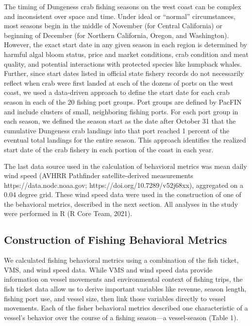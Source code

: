 \documentclass[]{elsarticle} %
\begin{document}
The timing of Dungeness crab fishing seasons on the west coast can be
complex and inconsistent over space and time. Under ideal or ``normal''
circumstances, most seasons begin in the middle of November (for Central
California) or beginning of December (for Northern California, Oregon,
and Washington). However, the exact start date in any given season in
each region is determined by harmful algal bloom status, price and
market conditions, crab condition and meat quality, and potential
interactions with protected species like humpback whales. Further, since
start dates listed in official state fishery records do not necessarily
reflect when crab were first landed at each of the dozens of ports on
the west coast, we used a data-driven approach to define the start date
for each crab season in each of the 20 fishing port groups. Port groups
are defined by PacFIN and include clusters of small, neighboring fishing
ports. For each port group in each season, we defined the season start
as the date after October 31 that the cumulative Dungeness crab landings
into that port reached 1 percent of the eventual total landings for the
entire season. This approach identifies the realized start date of the
crab fishery in each portion of the coast in each year.

The last data source used in the calculation of behavioral metrics was
mean daily wind speed (AVHRR Pathfinder satellite-derived measurements
https://data.nodc.noaa.gov; https://doi.org/10.7289/v52j68xx),
aggregated on a 0.04 degree grid. These wind speed data were used in the
construction of one of the behavioral metrics, described in the next
section. All analyses in the study were performed in R (R Core Team,
2021).

\hypertarget{construction-of-fishing-behavioral-metrics}{%
\subsection{Construction of Fishing Behavioral
Metrics}\label{construction-of-fishing-behavioral-metrics}}

We calculated fishing behavioral metrics using a combination of the fish
ticket, VMS, and wind speed data. While VMS and wind speed data provide
information on vessel movements and environmental context of fishing
trips, the fish ticket data allow us to derive important variables like
revenue, season length, fishing port use, and vessel size, then link
those variables directly to vessel movements. Each of the fisher
behavioral metrics described one characteristic of a vessel's behavior
over the course of a fishing season---a vessel-season (Table 1).
\end{document}
